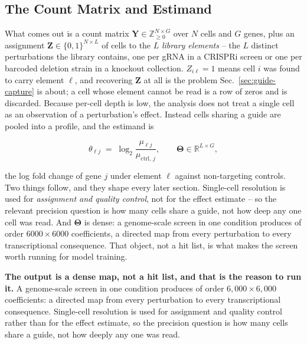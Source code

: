 \subsection{The Count Matrix and Estimand}
\label{sec:output-object}

What comes out is a count matrix $\mathbf{Y}\in\mathbb{Z}_{\ge0}^{N\times G}$ over
$N$ cells and $G$ genes, plus an assignment $\mathbf{Z}\in\{0,1\}^{N\times L}$ of
cells to the $L$ \emph{library elements} -- the $L$ distinct perturbations the
library contains, one per gRNA in a CRISPRi screen or one per barcoded
deletion strain in a knockout collection. $Z_{i\ell}=1$ means cell $i$ was found
to carry element $\ell$, and recovering $\mathbf{Z}$ at all is the problem
Sec.~\ref{sec:guide-capture} is about; a cell whose element cannot be read is a
row of zeros and is discarded. Because per-cell depth is low, the analysis
does not treat a single cell as an observation of a perturbation's effect.
Instead cells sharing a guide are pooled into a  profile, and
the estimand is

\begin{equation}
  \theta_{\ell j} \;=\; \log_2\frac{\mu_{\ell j}}{\mu_{\mathrm{ctrl},\,j}},
  \qquad \boldsymbol{\Theta}\in\mathbb{R}^{L\times G},
  \label{eq:theta}
\end{equation}

the log fold change of gene $j$ under element $\ell$ against non-targeting
controls. Two things follow, and they shape every later section. Single-cell
resolution is used for \emph{assignment and quality control}, not for the effect
estimate -- so the relevant precision question is how many cells share a guide,
not how deep any one cell was read. And $\boldsymbol{\Theta}$ is dense: a
genome-scale screen in one condition produces of order $6000\times6000$
coefficients, a directed map from every perturbation to every transcriptional
consequence. That object, not a hit list, is what makes the screen worth running
for model training.

\begin{keybox}
\textbf{The output is a dense map, not a hit list, and that is the reason to run
it.} A genome-scale screen in one condition produces of order
$6{,}000\times6{,}000$ coefficients: a directed map from every perturbation to
every transcriptional consequence. Single-cell resolution is used for assignment
and quality control rather than for the effect estimate, so the precision
question is how many cells share a guide, not how deeply any one was read.
\end{keybox}
